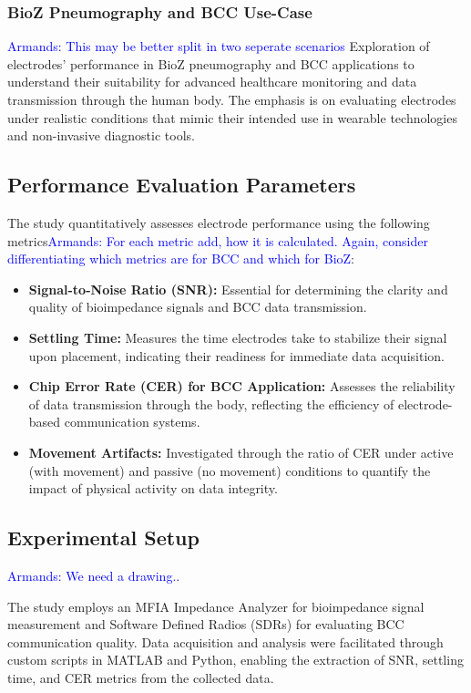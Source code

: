 \documentclass[conference]{IEEEtran}
\newcommand{\notea}[1]{\textcolor{blue}{Armands: #1}}
\begin{document}
\subsubsection{BioZ Pneumography and BCC Use-Case}
\notea{This may be better split in two seperate scenarios}
Exploration of electrodes' performance in BioZ pneumography and BCC applications to understand their suitability for advanced healthcare monitoring and data transmission through the human body. The emphasis is on evaluating electrodes under realistic conditions that mimic their intended use in wearable technologies and non-invasive diagnostic tools.

\subsection{Performance Evaluation Parameters}
The study quantitatively assesses electrode performance using the following metrics\notea{For each metric add, how it is calculated. Again, consider differentiating which metrics are for BCC and which for BioZ}:
\begin{itemize}
    \item \textbf{Signal-to-Noise Ratio (SNR):} Essential for determining the clarity and quality of bioimpedance signals and BCC data transmission.
    
    \item \textbf{Settling Time:} Measures the time electrodes take to stabilize their signal upon placement, indicating their readiness for immediate data acquisition.
    
    \item \textbf{Chip Error Rate (CER) for BCC Application:} Assesses the reliability of data transmission through the body, reflecting the efficiency of electrode-based communication systems.
    
    \item \textbf{Movement Artifacts:} Investigated through the ratio of CER under active (with movement) and passive (no movement) conditions to quantify the impact of physical activity on data integrity.
\end{itemize}

\subsection{Experimental Setup}
\notea{We need a drawing..}

The study employs an MFIA Impedance Analyzer for bioimpedance signal measurement and Software Defined Radios (SDRs) for evaluating BCC communication quality. Data acquisition and analysis were facilitated through custom scripts in MATLAB and Python, enabling the extraction of SNR, settling time, and CER metrics from the collected data.
\end{document}

